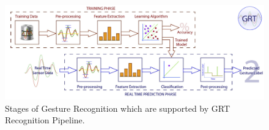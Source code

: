 \begin{figure}
	[h] \centering 
	\includegraphics[width=140mm]{figures/content/grt-pipeline.jpg} \caption{Stages of Gesture Recognition which are supported by GRT Recognition Pipeline. \cite{grt-spec} } \label{fg:grt:pipeline} 
\end{figure}
